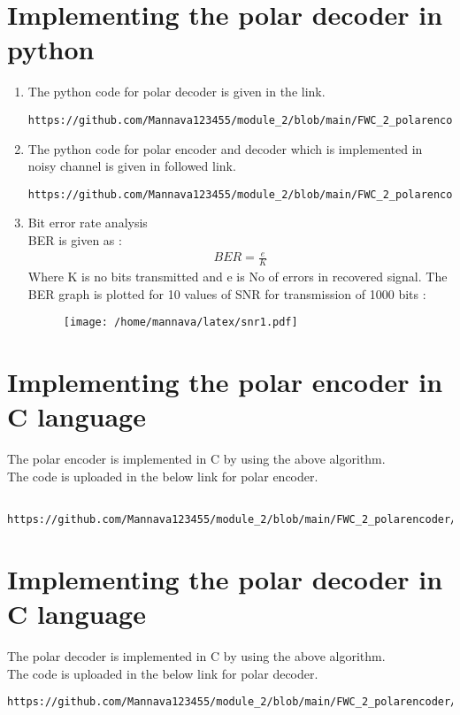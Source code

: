 \documentclass[journal,5pt,twocolumn]{IEEEtran}
\begin{document}
\section{\textbf{Implementing the polar decoder in python}}
\begin{enumerate}
\item The python code for polar decoder is given in the link.\vspace{5mm} 
\begin{lstlisting}
https://github.com/Mannava123455/module_2/blob/main/FWC_2_polarencoder/codes/polar_python/polar_encoder_and_decoder.py
\end{lstlisting}
\item The python code for polar encoder and decoder which is implemented in noisy channel is given in followed link.
\begin{lstlisting}
https://github.com/Mannava123455/module_2/blob/main/FWC_2_polarencoder/codes/polar_python/polarencoder_in_noisychannel.py
\end{lstlisting}
\item Bit error rate analysis \\
BER is given as :\\
\begin{align}
BER = \frac{e}{K}
\end{align}
Where K is no bits transmitted and e is No of errors in recovered signal.
The BER graph is plotted for 10 values of SNR for transmission of 1000 bits :
\begin{figure}[!ht]
\begin{center}
\texttt{[image: /home/mannava/latex/snr1.pdf]}
\end{center}
\label{Bit error rates of successive cancelation decoder}
\end{figure}
\end{enumerate}
\section{\textbf{Implementing the polar encoder in C language}}
The polar encoder is implemented in C by using the above algorithm. \\
 The code is uploaded in the below link for polar encoder.\\
 \begin{lstlisting}
 https://github.com/Mannava123455/module_2/blob/main/FWC_2_polarencoder/codes/polar_in_c_language/main.c
 \end{lstlisting}
\section{\textbf{Implementing the polar decoder in C language}}
The polar decoder is implemented in C by using the above algorithm. \\
 The code is uploaded in the below link for polar decoder.\\
 \begin{lstlisting}
https://github.com/Mannava123455/module_2/blob/main/FWC_2_polarencoder/codes/polar_decoder_c/decoder.c
 \end{lstlisting}
\end{document}
